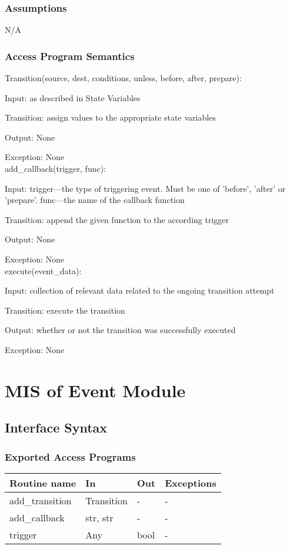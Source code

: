 \documentclass[12pt,titlepage]{article}
\begin{document}
\subsubsection{Assumptions}

N/A

\subsubsection{Access Program Semantics}

Transition(source, dest, conditions, unless, before, after, prepare):

Input: as described in State Variables

Transition: assign values to the appropriate state variables

Output: None

Exception: None \\
add\_callback(trigger, func):

Input: trigger---the type of triggering event. Must be one of 'before', 'after'
or 'prepare'. func---the name of the callback function

Transition: append the given function to the according trigger

Output: None

Exception: None \\
execute(event\_data):

Input: collection of relevant data related to the ongoing transition attempt

Transition: execute the transition

Output: whether or not the transition was successfully executed

Exception: None \\

\newpage

\color{red}
\section{MIS of Event Module}

\subsection{Interface Syntax}
\subsubsection{Exported Access Programs}
\begin{tabular}{| l | l | l | p{6cm} |}
  \hline
  \textbf{Routine name} & \textbf{In} & \textbf{Out} & \textbf{Exceptions}\\
  \hline
  add\_transition & Transition & - & - \\
  add\_callback & str, str & - & - \\
  trigger & Any & bool & - \\
  \hline
\end{tabular}
\end{document}
